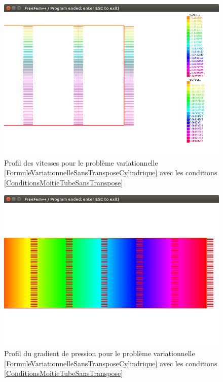 \documentclass[11pt,a4paper]{article}
\numberwithin{equation}{subsection}
\numberwithin{figure}{subsection}
\begin{document}
\begin{figure}
\centering
\includegraphics[scale=0.4]{StokesClassiqueVitessesCylindrique.png}
\caption{Profil des vitesses pour le problème variationnelle \ref{FormuleVariationnelleSansTransposeCylindrique} avec les conditions \ref{ConditionsMoitieTubeSansTranspose}}
\label{StokesClassiqueVitessesCylindrique}
\end{figure}

\begin{figure}
\centering
\includegraphics[scale=0.4]{StokesClassiquePressionCylindrique.png}
\caption{Profil du gradient de pression pour le problème variationnelle \ref{FormuleVariationnelleSansTransposeCylindrique} avec les conditions \ref{ConditionsMoitieTubeSansTranspose}}
\label{StokesClassiquePressionCylindrique}
\end{figure}
\end{document}
